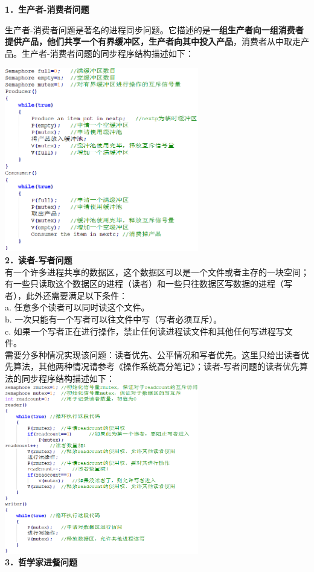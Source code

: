 \textbf{{1．生产者-消费者问题}}

生产者-消费者问题是著名的进程同步问题。它描述的是\textbf{一组生产者向一组消费者提供产品，他们共享一个有界缓冲区，生产者向其中投入产品}，消费者从中取走产品。{生产者-消费者问题的同步程序结构描述如下：}

\includegraphics[width=3.33333in,height=3.16667in]{png-jpeg-pics/2D9EBB3BBC8877B96131881E8416729B.png}\\
\textbf{{2．读者-写者问题}}\\
有一个许多进程共享的数据区，这个数据区可以是一个文件或者主存的一块空间；有一些只读取这个数据区的进程（读者）和一些只往数据区写数据的进程（写者），此外还需要满足以下条件：\\
a. 任意多个读者可以同时读这个文件。\\
b. 一次只能有一个写者可以往文件中写（写者必须互斥）。\\
c.
如果一个写者正在进行操作，禁止任何读进程读文件和其他任何写进程写文件。\\
需要分多种情况实现该问题：读者优先、公平情况和写者优先。这里只给出读者优先算法，其他两种情况请参考《操作系统高分笔记》；读者-写者问题的读者优先算法{的同步程序结构描述如下：}\\
\includegraphics[width=3.33333in,height=2.91667in]{png-jpeg-pics/C9D8567B9541037A8AE5C32D263DFE78.png}\\
\textbf{{3．哲学家进餐问题}}\\

